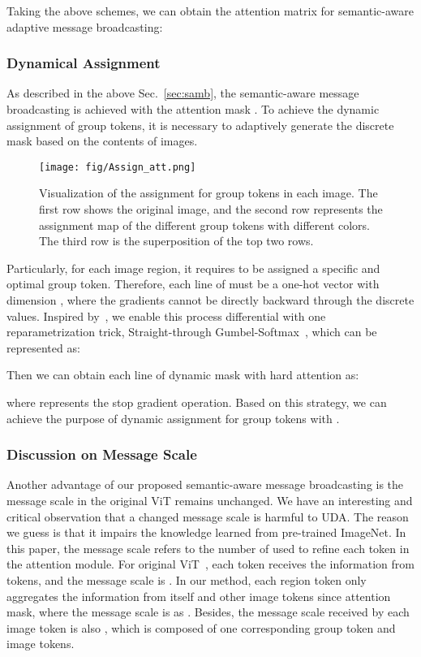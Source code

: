 \documentclass[journal]{IEEEtran}
\begin{document}
Taking the above schemes, we can obtain the attention matrix for semantic-aware adaptive message broadcasting:







\subsubsection{Dynamical Assignment} 
\label{sec:da}
As described in the above Sec.~\ref{sec:samb}, the semantic-aware message broadcasting is achieved with the attention mask . To achieve the dynamic assignment of group tokens, it is necessary to adaptively generate the discrete mask  based on the contents of images.
\begin{figure*}[htp]
    \centering
    \texttt{[image: fig/Assign\_att.png]}
    \caption{Visualization of the assignment for group tokens in each image. The first row shows the original image, and the second row represents the assignment map of the different group tokens with different colors. The third row is the superposition of the top two rows.}  
    \label{fig:region_assignment}
\end{figure*}
Particularly, for each image region, it requires to be assigned a specific and optimal group token. Therefore, each line  of   must be a one-hot vector with dimension , where the gradients cannot be directly backward through the discrete values. Inspired by~\cite{xu2022groupvit, van2017neuralVQVAE, jang2016categoricalGumbelsoftmax}, we enable this process differential with one reparametrization trick, Straight-through Gumbel-Softmax~\cite{jang2016categoricalGumbelsoftmax}, which can be represented as:

Then we can obtain each line  of dynamic mask  with hard attention as:

where  represents the stop gradient operation. Based on this strategy, we can achieve the purpose of dynamic assignment for group tokens with . 

\subsubsection{Discussion on Message Scale}
\label{sec:ms}
Another advantage of our proposed semantic-aware message broadcasting is the message scale in the original ViT remains unchanged. We have an interesting and critical observation that a changed message scale is harmful to UDA. The reason we guess is that it impairs the knowledge learned from pre-trained ImageNet. In this paper, the message scale refers to the number of  used to refine each token in the attention module. For original ViT~\cite{dosovitskiy2020imageViT}, each token receives the information from  tokens, and the message scale is . In our method, each region token  only aggregates the information from itself and other image tokens  since attention mask, where the message scale is as . Besides, the message scale received by each image token  is also , which is composed of one corresponding group token and  image tokens. 
\end{document}
